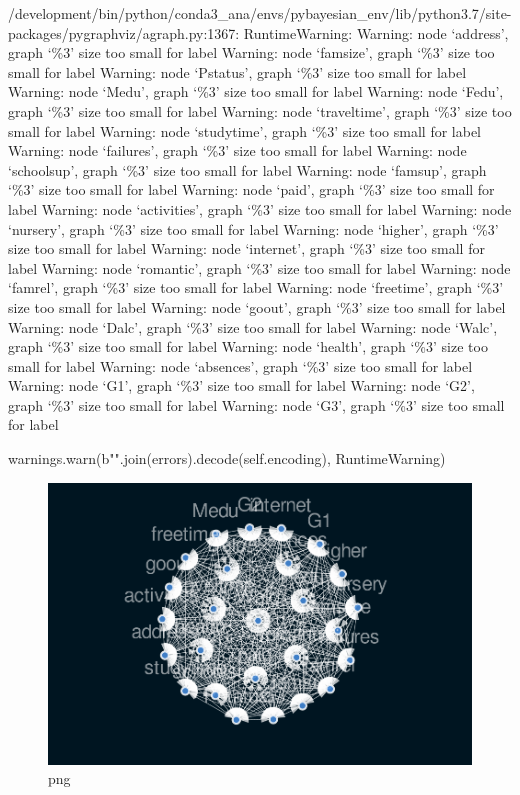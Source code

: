 \documentclass[
]{article}
\begin{document}
/development/bin/python/conda3\_ana/envs/pybayesian\_env/lib/python3.7/site-packages/pygraphviz/agraph.py:1367:
RuntimeWarning: Warning: node `address', graph `\%3' size too small for
label Warning: node `famsize', graph `\%3' size too small for label
Warning: node `Pstatus', graph `\%3' size too small for label Warning:
node `Medu', graph `\%3' size too small for label Warning: node `Fedu',
graph `\%3' size too small for label Warning: node `traveltime', graph
`\%3' size too small for label Warning: node `studytime', graph `\%3'
size too small for label Warning: node `failures', graph `\%3' size too
small for label Warning: node `schoolsup', graph `\%3' size too small
for label Warning: node `famsup', graph `\%3' size too small for label
Warning: node `paid', graph `\%3' size too small for label Warning: node
`activities', graph `\%3' size too small for label Warning: node
`nursery', graph `\%3' size too small for label Warning: node `higher',
graph `\%3' size too small for label Warning: node `internet', graph
`\%3' size too small for label Warning: node `romantic', graph `\%3'
size too small for label Warning: node `famrel', graph `\%3' size too
small for label Warning: node `freetime', graph `\%3' size too small for
label Warning: node `goout', graph `\%3' size too small for label
Warning: node `Dalc', graph `\%3' size too small for label Warning: node
`Walc', graph `\%3' size too small for label Warning: node `health',
graph `\%3' size too small for label Warning: node `absences', graph
`\%3' size too small for label Warning: node `G1', graph `\%3' size too
small for label Warning: node `G2', graph `\%3' size too small for label
Warning: node `G3', graph `\%3' size too small for label

warnings.warn(b"".join(errors).decode(self.encoding), RuntimeWarning)

\begin{figure}
\centering
\includegraphics{FirstCausalNexTutorial_files/FirstCausalNexTutorial_39_1.png}
\caption{png}
\end{figure}
\end{document}
